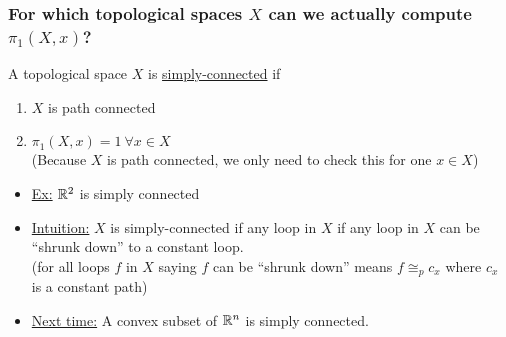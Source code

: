 \documentclass[../notes.tex]{subfiles}
\begin{document}
    \subsubsection{ For which topological spaces $X$ can we actually compute $\pi_1(X,x)$?}
    \begin{definition} A topological space $X$ is \underline{simply-connected} if
    \begin{enumerate}
        \item $X$ is path connected
        \item $\pi_1(X,x)={1}\ \forall x\in X$\\
            (Because $X$ is path connected, we only need to check this for one $x\in X$)
    \end{enumerate}
    \end{definition}
    \begin{itemize}
        \item \underline{Ex:} $\mathbb{R}^2$ is simply connected
        \item \underline{Intuition:} $X$ is simply-connected if any loop in $X$ if any loop in $X$ can
            be ``shrunk down'' to a constant loop.\\
            (for all loops $f$ in $X$ saying $f$ can be ``shrunk down'' means $f\cong_{p}c_x$ where $c_x$ is a constant path)
        \item \underline{Next time:} A convex subset of $\mathbb{R}^n$ is simply connected.
    \end{itemize}
\end{document}
